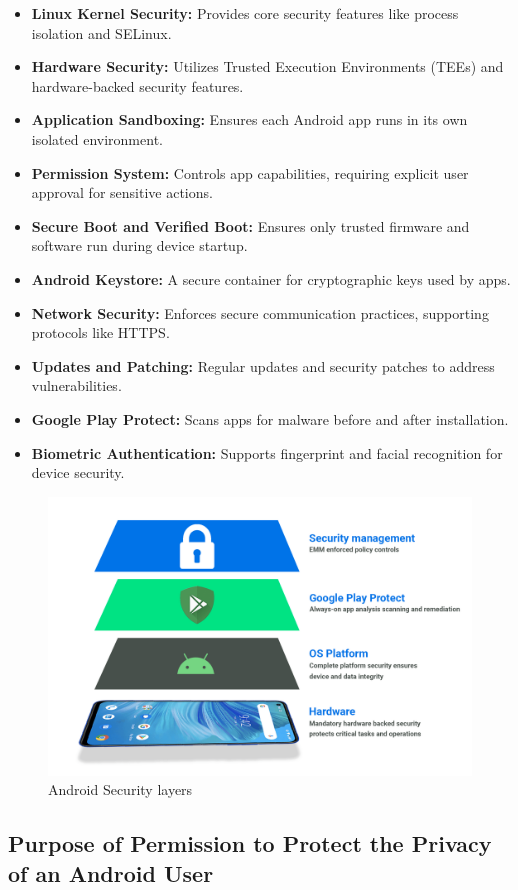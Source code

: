 \documentclass[11pt]{article}
\begin{document}
\begin{itemize}
    \item \textbf{Linux Kernel Security:} Provides core security features like process isolation and SELinux.
    \item \textbf{Hardware Security:} Utilizes Trusted Execution Environments (TEEs) and hardware-backed security features.
    \item \textbf{Application Sandboxing:} Ensures each Android app runs in its own isolated environment.
    \item \textbf{Permission System:} Controls app capabilities, requiring explicit user approval for sensitive actions.
    \item \textbf{Secure Boot and Verified Boot:} Ensures only trusted firmware and software run during device startup.
    \item \textbf{Android Keystore:} A secure container for cryptographic keys used by apps.
    \item \textbf{Network Security:} Enforces secure communication practices, supporting protocols like HTTPS.
    \item \textbf{Updates and Patching:} Regular updates and security patches to address vulnerabilities.
    \item \textbf{Google Play Protect:} Scans apps for malware before and after installation.
    \item \textbf{Biometric Authentication:} Supports fingerprint and facial recognition for device security.
\end{itemize}

\begin{figure}[H]
    \centering
    \includegraphics[width=.75\textwidth]{android security/android security_5.jpg}
    \caption{Android Security layers}
\end{figure}


\subsection{Purpose of Permission to Protect the Privacy of an Android User}
\end{document}
